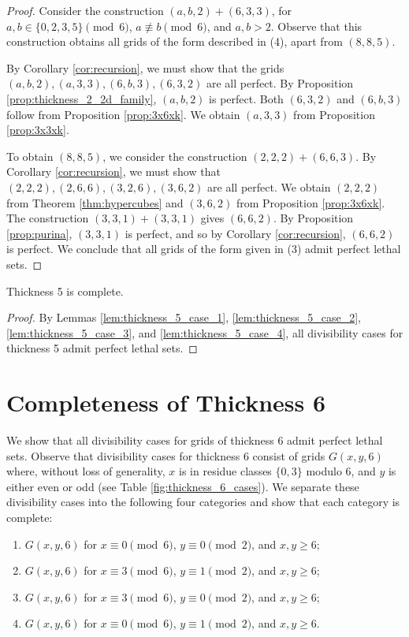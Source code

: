 \begin{proof}
Consider the construction $(a,b,2) + (6,3,3)$, for $a,b \in \{0,2,3,5\} \pmod 6$, $a \not\equiv b \pmod 6$, and $a,b > 2$. Observe that this construction obtains all grids of the form described in (4), apart from $(8,8,5)$.

By Corollary \ref{cor:recursion}, we must show that the grids $(a,b,2), (a,3,3), (6,b,3), (6,3,2)$ are all perfect. By Proposition \ref{prop:thickness_2_2d_family}, $(a,b,2)$ is perfect. Both $(6,3,2)$ and $(6,b,3)$ follow from Proposition \ref{prop:3x6xk}. We obtain $(a,3,3)$ from Proposition \ref{prop:3x3xk}.

To obtain $(8,8,5)$, we consider the construction $(2,2,2) + (6,6,3)$. By Corollary \ref{cor:recursion}, we must show that $(2,2,2), (2,6,6), (3,2,6), (3,6,2)$ are all perfect. We obtain $(2,2,2)$ from Theorem \ref{thm:hypercubes} and $(3,6,2)$ from Proposition \ref{prop:3x6xk}. The construction $(3,3,1)+(3,3,1)$ gives $(6,6,2)$. By Proposition \ref{prop:purina}, $(3,3,1)$ is perfect, and so by Corollary \ref{cor:recursion}, $(6,6,2)$ is perfect. We conclude that all grids of the form given in (3) admit perfect lethal sets.
\end{proof}

\begin{lem}
\label{lem:thickness_5_complete}
Thickness 5 is complete.
\end{lem}

\begin{proof}
By Lemmas \ref{lem:thickness_5_case_1}, \ref{lem:thickness_5_case_2}, \ref{lem:thickness_5_case_3}, and \ref{lem:thickness_5_case_4}, all divisibility cases for thickness 5 admit perfect lethal sets.
\end{proof}

\section{Completeness of Thickness 6}
We show that all divisibility cases for grids of thickness 6 admit perfect lethal sets. Observe that divisibility cases for thickness 6 consist of grids $G(x,y,6)$ where, without loss of generality, $x$ is in residue classes $\{0,3\}$ modulo 6, and $y$ is either even or odd (see Table \ref{fig:thickness_6_cases}). We separate these divisibility cases into the following four categories and show that each category is complete:

\begin{enumerate}
\item $G(x,y,6)$ for $x \equiv 0 \pmod 6$, $y \equiv 0 \pmod 2$, and $x,y \geq 6$;
\item $G(x,y,6)$ for $x \equiv 3 \pmod 6$, $y \equiv 1 \pmod 2$, and $x,y \geq 6$;
\item $G(x,y,6)$ for $x \equiv 3 \pmod 6$, $y \equiv 0 \pmod 2$, and $x,y \geq 6$;
\item $G(x,y,6)$ for $x \equiv 0 \pmod 6$, $y \equiv 1 \pmod 2$, and $x,y \geq 6$.
\end{enumerate}

